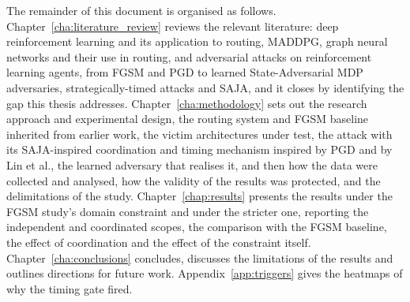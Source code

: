 The remainder of this document is organised as follows.
Chapter~\ref{cha:literature_review} reviews the relevant literature: deep reinforcement
learning and its application to routing, MADDPG, graph neural networks and their use in
routing, and adversarial attacks on reinforcement learning agents, from FGSM and PGD to
learned State-Adversarial MDP adversaries, strategically-timed attacks and SAJA, and it
closes by identifying the gap this thesis addresses.
Chapter~\ref{cha:methodology} sets out the research approach and experimental design,
the routing system and FGSM baseline inherited from earlier work, the victim
architectures under test, the attack with its SAJA-inspired coordination and
timing mechanism inspired by PGD and by Lin et al., the learned adversary that realises
it, and then how
the data were collected and analysed, how the validity of the results was protected,
and the delimitations of the study. Chapter~\ref{chap:results} presents the results under the FGSM study's domain
constraint and under the stricter one, reporting the independent and coordinated
scopes, the comparison with the FGSM baseline, the effect of coordination and the effect
of the constraint itself.
Chapter~\ref{cha:conclusions} concludes, discusses the limitations of the results and
outlines directions for future work. Appendix~\ref{app:triggers} gives the heatmaps of
why the timing gate fired.
